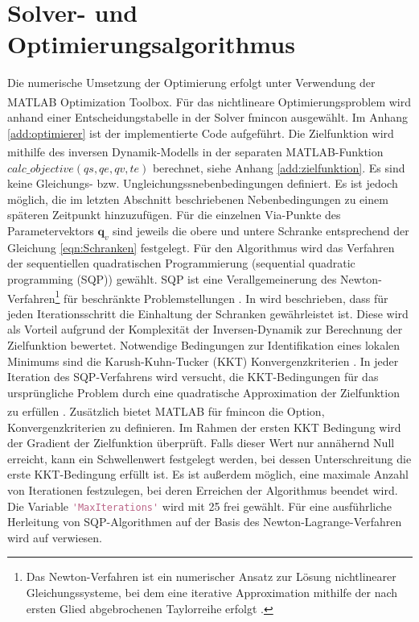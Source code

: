 \section{Solver- und Optimierungsalgorithmus}
Die numerische Umsetzung der Optimierung erfolgt unter Verwendung der MATLAB\textsuperscript{\textregistered} Optimization Toolbox\texttrademark. Für das nichtlineare Optimierungsproblem wird anhand einer Entscheidungstabelle in \cite[S.~80]{OptimizationToolbox.2023} der Solver fmincon ausgewählt.  Im Anhang \ref{add:optimierer} ist der implementierte Code aufgeführt. Die Zielfunktion wird mithilfe des inversen Dynamik-Modells in der separaten MATLAB\textsuperscript{\textregistered}-Funktion $calc\_objective(qs,qe,qv,te)$ berechnet, siehe Anhang \ref{add:zielfunktion}. Es sind keine Gleichungs- bzw. Ungleichungssnebenbedingungen definiert. Es ist jedoch möglich, die im letzten Abschnitt beschriebenen Nebenbedingungen zu einem späteren Zeitpunkt hinzuzufügen. Für die einzelnen Via-Punkte des Parametervektors $\bm{q}_{v}$ sind jeweils die obere und untere Schranke entsprechend der Gleichung \ref{eqn:Schranken} festgelegt. Für den Algorithmus wird das Verfahren der sequentiellen quadratischen Programmierung (sequential quadratic programming (SQP)) gewählt.  SQP ist eine Verallgemeinerung des Newton-Verfahren\footnote{Das Newton-Verfahren ist ein numerischer Ansatz zur Lösung nichtlinearer Gleichungssysteme, bei dem eine iterative Approximation mithilfe der nach ersten Glied abgebrochenen Taylorreihe erfolgt \cite[S.~46]{Papageorgiou.2015}.} für beschränkte Problemstellungen \cite[S.~113]{Papageorgiou.2015}. In \cite[S.~253]{OptimizationToolbox.2023} wird beschrieben, dass für jeden Iterationsschritt die Einhaltung der Schranken gewährleistet ist. Diese wird als Vorteil aufgrund der Komplexität  der Inversen-Dynamik zur Berechnung der Zielfunktion  bewertet. Notwendige Bedingungen zur Identifikation eines lokalen Minimums sind die  Karush-Kuhn-Tucker (KKT) Konvergenzkriterien  \cite[S.~321]{Nocedal.2006}.  In jeder Iteration des SQP-Verfahrens wird versucht, die KKT-Bedingungen für das ursprüngliche Problem durch eine quadratische Approximation der Zielfunktion zu erfüllen \cite[S.~337~ff.]{Reinhardt.2013}. Zusätzlich bietet MATLAB\textsuperscript{\textregistered} für fmincon die Option, Konvergenzkriterien zu definieren. Im Rahmen der ersten KKT Bedingung wird der Gradient der Zielfunktion überprüft. Falls dieser Wert nur annähernd Null erreicht, kann ein Schwellenwert festgelegt werden, bei dessen Unterschreitung die erste KKT-Bedingung erfüllt ist. Es ist außerdem möglich, eine maximale Anzahl von Iterationen festzulegen, bei deren Erreichen der Algorithmus beendet wird. Die Variable \lstinline[language=Matlab]|'MaxIterations'| wird mit 25 frei gewählt.  Für eine ausführliche Herleitung von SQP-Algorithmen auf der Basis des Newton-Lagrange-Verfahren wird auf \cite[S.~529~ff.]{Nocedal.2006} verwiesen.
%
